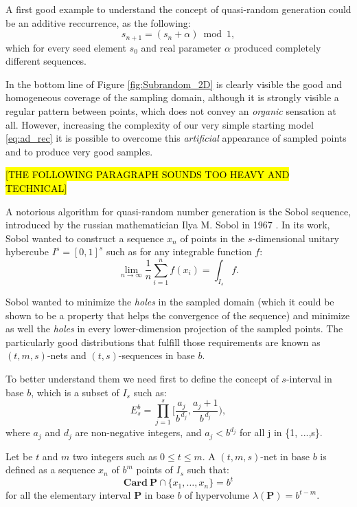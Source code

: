 A first good example to understand the concept of quasi-random generation could be an additive reccurrence, as the following:
\begin{equation}
    s_{n+1} = ( s_n + \alpha ) \bmod 1,
    \label{eq:ad_rec}
\end{equation}
which for every seed element $s_0$ and real parameter $\alpha$ produced completely different sequences.

In the bottom line of Figure \ref{fig:Subrandom_2D} is clearly visible the good and homogeneous coverage of the sampling domain, although it is strongly visible a regular pattern between points, which does not convey an \textit{organic} sensation at all. However, increasing the complexity of our very simple starting model \ref{eq:ad_rec} it is possible to overcome this \textit{artificial} appearance of sampled points and to produce very good samples.

\hl{[THE FOLLOWING PARAGRAPH SOUNDS TOO HEAVY AND TECHNICAL]}

A notorious algorithm for quasi-random number generation is the Sobol sequence, introduced by the russian mathematician Ilya M. Sobol in 1967 \cite{SOBOL2001271}. In its work, Sobol wanted to construct a sequence $x_n$ of points in the $s$-dimensional unitary hybercube $I^s = [0,1]^s$ such as for any integrable function $f$:
\begin{equation}
    \lim_{n\to\infty} \frac{1}{n} \sum_{i=1}^{n} f(x_i) = \int_{I_s} f.
\end{equation}

Sobol wanted to minimize the \textit{holes} in the sampled domain (which it could be shown to be a property that helps the convergence of the sequence) and minimize as well the \textit{holes} in every lower-dimension projection of the sampled points. The particularly good distributions that fulfill those requirements are known as $(t,m,s)$-nets and $(t,s)$-sequences in base $b$.

To better understand them we need first to define the concept of $s$-interval in base $b$, which is a subset of $I_s$ such as:
\begin{equation}
    E_s^b = \prod_{j=1}^{s} \Bigg[ \frac{a_j}{b^{\,d_j}}, \frac{a_j + 1}{b^{\,d_j}}\Bigg),
\end{equation}
where $a_j$ and $d_j$ are non-negative integers, and $a_j < b^{d_j}$ for all j in \{1, ...,s\}.

Let be $t$ and $m$ two integers such as $0 \leq t \leq m$. A $(t,m,s)$-net in base $b$ is defined as a sequence $x_n$ of $b^m$ points of $I_s$ such that:
\begin{equation}
    \mathbf{Card} \ \mathbf{P} \cap \{x_1, \dots, x_n \} = b^t
\end{equation}
for all the elementary  interval $\mathbf{P}$ in base $b$ of hypervolume $\lambda(\mathbf{P}) =  b^{t-m}$.

